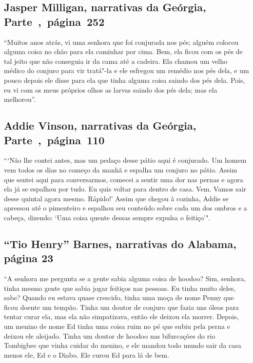 \subsection{Jasper Milligan, narrativas da Geórgia, Parte~,~página~252}
\label{ref193}

``Muitos anos atrás, vi uma senhora que foi conjurada nos pés; alguém
colocou alguma coisa no chão para ela caminhar por cima. Bem, ela ficou
com os pés de tal jeito que não conseguia ir da cama até a cadeira. Ela
chamou um velho médico do conjuro para vir tratá"-la e ele esfregou um
remédio nos pés dela, e um pouco depois ele disse para ela que tinha
alguma coisa saindo dos pés dela. Pois, eu vi com os meus próprios olhos
as larvas saindo dos pés dela; mas ela melhorou''.

\subsection{Addie Vinson, narrativas da Geórgia, Parte~,~página~110}
\label{ref271}

```Não lhe contei antes, mas um pedaço desse pátio aqui é conjurado. Um
homem vem todos os dias no começo da manhã e espalha um conjuro no
pátio. Assim que sentei aqui para conversarmos, comecei a sentir uma dor
nas pernas e agora ela já se espalhou por tudo. Eu quis voltar para
dentro de casa. Vem. Vamos sair desse quintal agora mesmo. Rápido!'
Assim que chegou à cozinha, Addie se apressou até o pimenteiro e
espalhou seu conteúdo sobre cada um dos ombros e a cabeça, dizendo: `Uma
coisa quente dessas sempre expulsa o feitiço'".

\subsection{``Tio Henry'' Barnes, narrativas do Alabama, página 23} \label{ref16}

``A senhora me pergunta se a gente sabia alguma coisa de hoodoo? Sim,
senhora, tinha mesmo gente que sabia jogar feitiços nas pessoas. Eu
tinha muito deles, sabe? Quando eu estava quase crescido, tinha uma moça %
de nome Penny que ficou doente um tempão. Tinha um doutor de conjuro que
fazia uns óleos para tentar curar ela, mas ela não simpatizava, então
ele deixou ela morrer. Depois, um menino de nome Ed tinha uma coisa ruim
no pé que subiu pela perna e deixou ele aleijado. Tinha um doutor de
hoodoo nas bifurcações do rio Tombigbee que vinha cuidar do menino, e
ele mandou todo mundo sair da casa menos ele, Ed e o Diabo. Ele curou Ed
para lá de bem.

